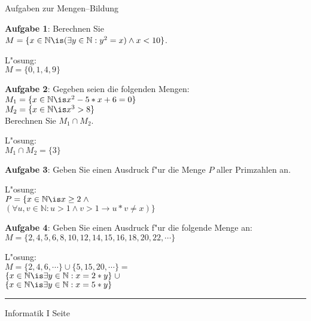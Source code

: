 \begin{slide}{}
\normalsize
\begin{center}
  Aufgaben zur Mengen--Bildung
\end{center}
\vspace{0.5cm}

\footnotesize
\textbf{Aufgabe 1}: Berechnen Sie \\[0.3cm]
\hspace*{1.3cm} $M = \{ x \in \mathbb{N} \is (\exists y \in \mathbb{N}: y^2 = x) \wedge x < 10 \}$.

L"osung: \\[0.3cm]
\hspace*{1.3cm} $M = \{0, 1, 4, 9\}$
\vspace{0.5cm}

\textbf{Aufgabe 2}: Gegeben seien die folgenden Mengen: \\[0.3cm]
\hspace*{1.3cm} $M_1 = \{ x \in \mathbb{N} \is x^2 - 5 * x + 6 = 0 \}$ \\[0.3cm]
\hspace*{1.3cm} $M_2 = \{ x \in \mathbb{N} \is x^3 > 8 \}$ \\[0.3cm]
Berechnen Sie $M_1 \cap M_2$.

L"osung: \\[0.3cm]
\hspace*{1.3cm} $M_1 \cap M_2 = \{ 3 \}$
\vspace{0.5cm}

\textbf{Aufgabe 3}: Geben Sie einen Ausdruck f"ur die Menge $P$ aller Primzahlen an.

L"osung: \\[0.3cm]
\hspace*{0.0cm} $P = \{ x \in \mathbb{N} \is x \geq 2 \;\wedge$ \\
\hspace*{3.3cm} $(\forall u, v \in \mathbb{N}: u > 1 \wedge v > 1 \rightarrow u * v \not= x) \}$

\textbf{Aufgabe 4}: Geben Sie einen Ausdruck f"ur die folgende Menge an: \\[0.3cm]
\hspace*{1.3cm} $M = \{ 2, 4, 5, 6, 8, 10, 12, 14, 15, 16, 18, 20, 22, \cdots \}$

L"osung: \\[0.3cm]
\hspace*{1.3cm} $M = \{ 2, 4, 6, \cdots \} \cup \{ 5, 15, 20, \cdots \} =$ \\[0.3cm]
\hspace*{2.9cm} $\{ x \in \mathbb{N} \is \exists y \in \mathbb{N}: x = 2 * y \} \; \cup$ \\
\hspace*{2.9cm} $\{ x \in \mathbb{N} \is \exists y \in \mathbb{N}: x = 5 * y \}$

\vspace*{\fill}
\tiny \addtocounter{mypage}{1}
\rule{15cm}{1mm}
Informatik I  \hspace*{\fill} Seite 
\end{slide}


